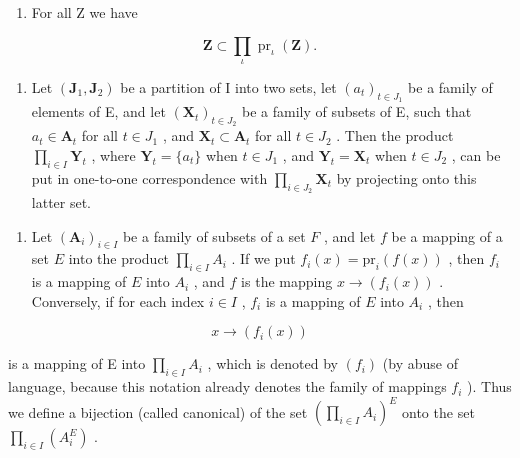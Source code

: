 \begin{enumerate}
\def\labelenumi{(\alph{enumi})}
\setcounter{enumi}{3}
\tightlist
\item
  For all Z we have
\end{enumerate}

\[
\mathbf {Z} \subset \prod_ {\iota} \operatorname{pr} _ {\iota} (\mathbf {Z}).\tag{49}
\]

\begin{enumerate}
\def\labelenumi{(\alph{enumi})}
\setcounter{enumi}{4}
\tightlist
\item
  Let \((\mathbf{J}_1, \mathbf{J}_2)\) be a partition of I into two sets, let \((a_t)_{t \in J_1}\) be a family of elements of E, and let \((\mathbf{X}_t)_{t \in J_2}\) be a family of subsets of E, such that \(a_t \in \mathbf{A}_t\) for all \(t \in J_1\) , and \(\mathbf{X}_t \subset \mathbf{A}_t\) for all \(t \in J_2\) . Then the product \(\prod_{i \in I} \mathbf{Y}_t\) , where \(\mathbf{Y}_t = \{a_t\}\) when \(t \in J_1\) , and \(\mathbf{Y}_t = \mathbf{X}_t\) when \(t \in J_2\) , can be put in one-to-one correspondence with \(\prod_{i \in J_2} \mathbf{X}_t\) by projecting onto this latter set.
\end{enumerate}

\begin{enumerate}
\def\labelenumi{\arabic{enumi}.}
\setcounter{enumi}{12}
\tightlist
\item
  Let \((\mathbf{A}_i)_{i\in I}\) be a family of subsets of a set \(F\) , and let \(f\) be a mapping of a set \(E\) into the product \(\prod_{i\in I} A_i\) . If we put \(f_i(x) = \text{pr}_i(f(x))\) , then \(f_i\) is a mapping of \(E\) into \(A_i\) , and \(f\) is the mapping \(x \to (f_i(x))\) . Conversely, if for each index \(i \in I\) , \(f_i\) is a mapping of \(E\) into \(A_i\) , then
\end{enumerate}

\[
x \rightarrow (f _ {i} (x))
\]

is a mapping of E into \(\prod_{i\in I}A_i\) , which is denoted by \((f_i)\) (by abuse of language, because this notation already denotes the family of mappings \(f_i\) ). Thus we define a bijection (called canonical) of the set \(\left(\prod_{i\in I}A_i\right)^E\) onto the set \(\prod_{i\in I}(A_i^E)\) .

